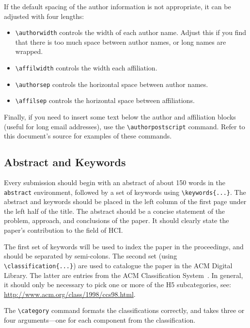 \documentclass[preprint]{../latex/sigchi-modern}
\begin{document}
If the default spacing of the author information is not appropriate, it can be
adjusted with four lengths:
\begin{itemize}
  \item \texttt{\textbackslash authorwidth} controls the width of each author
    name.
    Adjust this if you find that there is too much space between author names,
    or long names are wrapped.
  \item \texttt{\textbackslash affilwidth} controls the width each affiliation.
  \item \texttt{\textbackslash authorsep} controls the horizontal space
    between author names.
  \item \texttt{\textbackslash affilsep} controls the horizontal space between
    affiliations.
\end{itemize}

Finally, if you need to insert some text below the author and affiliation
blocks (useful for long email addresses), use the
\texttt{\textbackslash authorpostscript} command. Refer to this document's
source for examples of these commands.

\subsection{Abstract and Keywords}
Every submission should begin with an abstract of about 150 words in the
\texttt{abstract} environment, followed by a set of keywords using
\texttt{\textbackslash keywords\{...\}}. The abstract and keywords should be
placed in the left column of the first page under the left half of the title.
The abstract should be a concise statement of the problem, approach, and
conclusions of the paper. It should clearly state the paper's contribution to
the field of HCI.

The first set of keywords will be used to index the paper in the proceedings,
and should be separated by semi-colons. The second set (using
\texttt{\textbackslash classification\{...\}}) are used to catalogue the paper
in the ACM Digital Library. The latter are entries from the ACM Classification
System~\cite{acm_categories}. In general, it should only be necessary to pick
one or more of the H5 subcategories, see:
\url{http://www.acm.org/class/1998/ccs98.html}.

The \texttt{\textbackslash category} command formats the classifications 
correctly, and takes three or four arguments---one for each component from the
classification.
\end{document}
